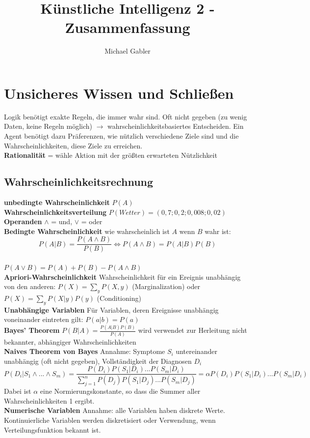 \documentclass[12pt]{article}
\begin{document}
	\title{Künstliche Intelligenz 2 - Zusammenfassung}
	\author{Michael Gabler}
	\maketitle
	\tableofcontents
	\newpage
	
	\section{Unsicheres Wissen und Schließen}
	Logik benötigt exakte Regeln, die immer wahr sind. Oft nicht gegeben (zu wenig Daten, keine Regeln möglich) $\rightarrow$ wahrscheinlichkeitsbasiertes Entscheiden. Ein Agent benötigt dazu Präferenzen, wie nützlich verschiedene Ziele sind und die Wahrscheinlichkeiten, diese Ziele zu erreichen.\\
	\textbf{Rationalität} = wähle Aktion mit der größten erwarteten Nützlichkeit
	
	\subsection{Wahrscheinlichkeitsrechnung}
	\textbf{unbedingte Wahrscheinlichkeit} $P(A)$\\
	\textbf{Wahrscheinlichkeitsverteilung} $P(Wetter) = (0,7; 0,2; 0,008; 0,02)$\\
	\textbf{Operanden} $\wedge$ = und, $\vee$ = oder\\
	\textbf{Bedingte Wahrscheinlichkeit} wie wahrscheinlich ist $A$ wenn $B$ wahr ist:
	$$P(A|B) = \frac{P(A \wedge B)}{P(B)} \Leftrightarrow P(A \wedge B) = P(A|B) P(B)$$\\
	$P(A \vee B) = P(A) + P(B) - P(A \wedge B)$\\
	\textbf{Apriori-Wahrscheinlichkeit} Wahrscheinlichkeit für ein Ereignis unabhängig von den anderen: $P(X) = \sum_y P(X,y)$ (Marginalization) oder $P(X) = \sum_y P(X|y) P(y)$ (Conditioning)\\
	\textbf{Unabhängige Variablen} Für Variablen, deren Ereignisse unabhängig voneinander eintreten gilt: $P(a|b) = P(a)$\\
	\textbf{Bayes' Theorem} $P(B|A) = \frac{P(A|B) P(B)}{P(A)}$ wird verwendet zur Herleitung nicht bekannter, abhängiger Wahrscheinlichkeiten\\
	\textbf{Naives Theorem von Bayes} Annahme: Symptome $S_i$ untereinander unabhängig (oft nicht gegeben), Vollständigkeit der Diagnosen $D_i$
	$$P(D_i|S_1 \wedge ... \wedge S_m) = \frac{P(D_i) P(S_1|D_i) ... P(S_m|D_i)}{\sum_{j=1}^{n} P(D_j) P(S_1|D_j) ... P(S_m|D_j)} = \alpha P(D_i) P(S_1|D_i) ... P(S_m|D_i)$$
	Dabei ist $\alpha$ eine Normierungskonstante, so dass die Summer aller Wahrscheinlichkeiten 1 ergibt.\\
	\textbf{Numerische Variablen} Annahme: alle Variablen haben diskrete Werte. Kontinuierliche Variablen werden diskretisiert oder Verwendung, wenn Verteilungsfunktion bekannt ist.
	
\end{document}
